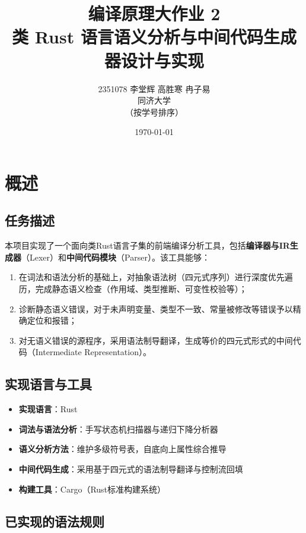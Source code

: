 \documentclass[12pt,a4paper]{ctexart}
\title{\textbf{编译原理大作业 2} \\ \Large 类 Rust 语言语义分析与中间代码生成器设计与实现}
\author{2351078 李堂辉 \quad 2351837 高胜寒 \quad 2352197 冉子易 \\ 同济大学 \\ \small （按学号排序）}
\date{\today}
\begin{document}
\maketitle

\tableofcontents
\newpage

\section{概述}

\subsection{任务描述}

本项目实现了一个面向类Rust语言子集的前端编译分析工具，包括\textbf{编译器与IR生成器}（Lexer）和\textbf{中间代码模块}（Parser）。该工具能够：

\begin{enumerate}
    \item 在词法和语法分析的基础上，对抽象语法树（四元式序列）进行深度优先遍历，完成静态语义检查（作用域、类型推断、可变性校验等）；
    \item 诊断静态语义错误，对于未声明变量、类型不一致、常量被修改等错误予以精确定位和报错；
    \item 对无语义错误的源程序，采用语法制导翻译，生成等价的四元式形式的中间代码（Intermediate Representation）。
\end{enumerate}

\subsection{实现语言与工具}

\begin{itemize}
    \item \textbf{实现语言}：Rust
    \item \textbf{词法与语法分析}：手写状态机扫描器与递归下降分析器
    \item \textbf{语义分析方法}：维护多级符号表，自底向上属性综合推导
    \item \textbf{中间代码生成}：采用基于四元式的语法制导翻译与控制流回填
    \item \textbf{构建工具}：Cargo（Rust标准构建系统）
\end{itemize}

\subsection{已实现的语法规则}
\end{document}
